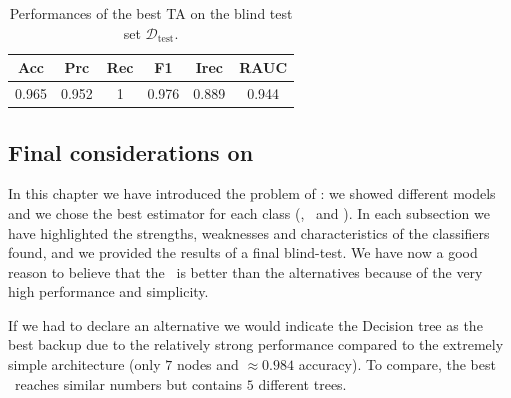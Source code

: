 \begin{table}[!ht]
	\caption{Performances of the best TA on the blind test set $\mathscr
			D_\mathrm{test}$.}\label{tbl:qrp-ta-test}

	\bigskip
	\setlength{\tabcolsep}{6pt}
	\centering
	\begin{tabular}{cccccc}
		\toprule
		\textbf{Acc} & \textbf{Prc} & \textbf{Rec} & \textbf{F1} & \textbf{Irec} & \textbf{RAUC} \\
		\midrule
		0.965        & 0.952        & 1            & 0.976       & 0.889         & 0.944         \\
		\bottomrule
	\end{tabular}
\end{table}

\subsection{Final considerations on \qrp}
In this chapter we have introduced the problem of \qrp: we showed different models and we
chose the best estimator for each class (\dt, \rf\ and \ta). In each subsection we have
highlighted the strengths, weaknesses and characteristics of the classifiers found, and we provided the
results of a final blind-test. We have now a good reason to believe that the \ta\ is better than the
alternatives because of the very high performance and simplicity.

If we had to declare an alternative we would indicate the Decision tree as the best backup due to
the relatively strong performance compared to the extremely simple architecture (only $7$ nodes and
$\approx 0.984$ accuracy). To compare, the best \rf\ reaches similar numbers but contains $5$
different trees.








